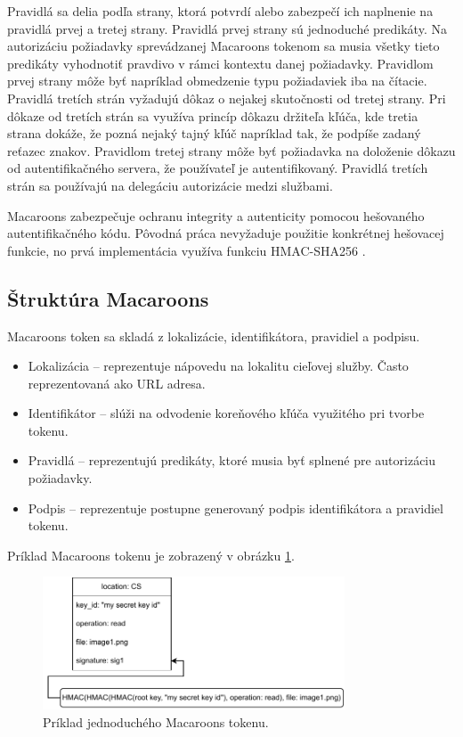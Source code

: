 Pravidlá sa delia podľa strany, ktorá potvrdí alebo zabezpečí ich naplnenie na pravidlá prvej a tretej strany. Pravidlá prvej strany sú jednoduché predikáty. Na autorizáciu požiadavky sprevádzanej Macaroons tokenom sa musia všetky tieto predikáty vyhodnotiť pravdivo v rámci kontextu danej požiadavky. Pravidlom prvej strany môže byť napríklad obmedzenie typu požiadaviek iba na čítacie. Pravidlá tretích strán vyžadujú dôkaz o nejakej skutočnosti od tretej strany. Pri dôkaze od tretích strán sa využíva princíp dôkazu držiteľa kľúča, kde tretia strana dokáže, že pozná nejaký tajný kľúč napríklad tak, že podpíše zadaný reťazec znakov. Pravidlom tretej strany môže byť požiadavka na doloženie dôkazu od autentifikačného servera, že používateľ je autentifikovaný. Pravidlá tretích strán sa používajú na delegáciu autorizácie medzi službami.

Macaroons zabezpečuje ochranu integrity a autenticity pomocou hešovaného autentifikačného kódu. Pôvodná práca \cite{macaroons_paper} nevyžaduje použitie konkrétnej hešovacej funkcie, no prvá implementácia \cite{macaroons_git} využíva funkciu HMAC-SHA256 \cite{hmac}.

\subsection{Štruktúra Macaroons}

Macaroons token sa skladá z lokalizácie, identifikátora, pravidiel a podpisu. 

\begin{itemize}
    \item Lokalizácia -- reprezentuje nápovedu na lokalitu cieľovej služby. Často reprezentovaná ako URL adresa.
    \item Identifikátor -- slúži na odvodenie koreňového kľúča využitého pri tvorbe tokenu.
    \item Pravidlá -- reprezentujú predikáty, ktoré musia byť splnené pre autorizáciu požiadavky.
    \item Podpis -- reprezentuje postupne generovaný podpis identifikátora a pravidiel tokenu.
\end{itemize}

Príklad Macaroons tokenu je zobrazený v obrázku \ref{fig:macaroon_example}.


\begin{figure}
    \centerline{\includegraphics[width=0.8\textwidth]{images/basic_macaroon}}
    \caption[Macaroons token]{Príklad jednoduchého Macaroons tokenu.}
    \label{fig:macaroon_example}
\end{figure}

